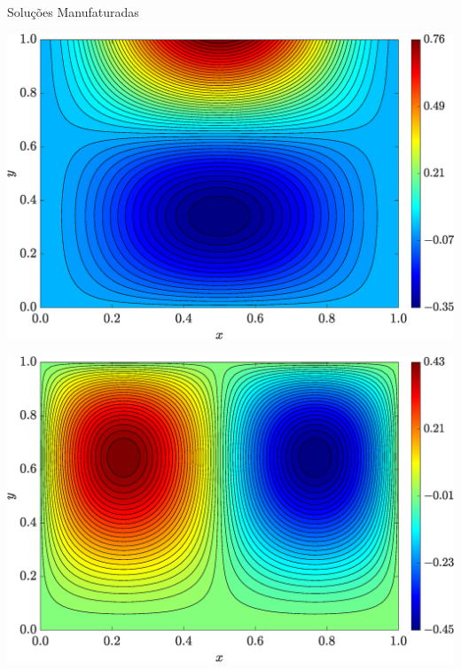 \begin{frame}{Soluções Manufaturadas}
    \centering
    \captionsetup{justification=centering}
    \label{fig:sol_manufaturadas_11}
    \begin{minipage}{0.48\textwidth}
        \centering
        \includegraphics[width=\textwidth]{Figures/Exact_Map_NormErr_2nd_Betann_0.1_Re_1_Wi_1_epsilon_0_xi_0_alphaG_0_Dt_1e-06_at_0.05_tipsim_1_MMS_12_U.eps}
        \label{fig_solexauCase11}
    \end{minipage}
    \hfill
    \begin{minipage}{0.48\textwidth}
        \centering
        \includegraphics[width=\textwidth]{Figures/Exact_Map_NormErr_2nd_Betann_0.1_Re_1_Wi_1_epsilon_0_xi_0_alphaG_0_Dt_1e-06_at_0.05_tipsim_1_MMS_12_V.eps}
        \label{fig_solexavCase11}
    \end{minipage}
\end{frame}

